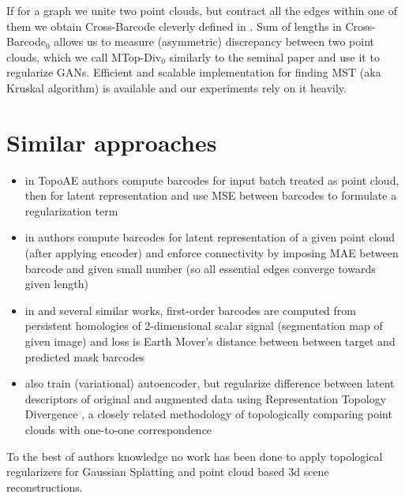 If for a graph we unite two point clouds, but contract all the edges within one of them we obtain Cross-Barcode cleverly defined in \cite{MTopDiv}. Sum of lengths in Cross-Barcode${}_0$ allows us to measure (asymmetric) discrepancy between two point clouds, which we call MTop-Div${}_{0}$ similarly to the seminal paper and use it to regularize GANs. Efficient and scalable implementation for finding MST (aka Kruskal algorithm) is available \cite{Hofer17a, Hofer19a} and our experiments rely on it heavily.

\section{Similar approaches}
\begin{itemize}
    \item in TopoAE \cite{moor2021topological} authors compute barcodes for input batch treated as point cloud, then for latent representation and use MSE between barcodes to formulate a regularization term
    \item in \cite{Hofer19a} authors compute barcodes for latent representation of a given point cloud (after applying encoder) and enforce connectivity by  imposing MAE between barcode and given small number (so all essential edges converge towards given length)
    \item in \cite{topo-segm} and several similar works, first-order barcodes are computed from persistent homologies of 2-dimensional scalar signal (segmentation map of given image) and loss is Earth Mover's distance between between target and predicted mask barcodes
    \item \cite{balabin2024disentanglement} also train (variational) autoencoder, but regularize difference between latent descriptors of original and augmented data using Representation Topology Divergence \cite{rtd}, a closely related methodology of topologically comparing point clouds with one-to-one correspondence
\end{itemize}
To the best of authors knowledge no work has been done to apply topological regularizers for Gaussian Splatting and point cloud based 3d scene reconstructions.
